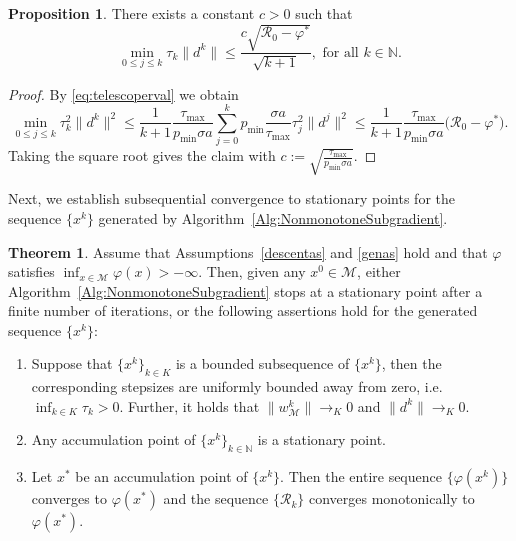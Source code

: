 \documentclass[a4paper, 12pt]{article}
\numberwithin{equation}{section}
\theoremstyle{bolddef}
\theoremstyle{definition}
\theoremstyle{boldplain}
\newtheorem{theorem}[definition]{Theorem}
\newtheorem{proposition}[definition]{Proposition}
\newcommand{\xk}{x^k}
\newcommand{\wk}{w^k}
\newcommand{\dk}{d^k}
\newcommand{\tauk}{\tau_k}
\newcommand{\pmin}{p_{\min}}
\newcommand{\taumax}{\tau_\mathrm{max}}
\newcommand{\Rvalue}{\mathcal{R}}
\begin{document}
\begin{proposition}\label{prop:convest}
There exists a constant $c > 0$ such that
\begin{equation}
	\min_{0 \leq j \leq k} \tauk \|\dk\| \leq \frac{c\sqrt{\Rvalue_0 - \varphi^*}}{\sqrt{k+1}}, \text{ for all } k \in \mathbb{N}.
\end{equation}
\end{proposition}
\begin{proof}
By \eqref{eq:telescoperval} we obtain
\begin{equation*}
	\min_{0 \leq j \leq k} \tauk^2 \|\dk\|^2 \leq \frac{1}{k+1} \frac{\taumax}{\pmin \sigma a}\sum_{j=0}^{k} \pmin \frac{\sigma a}{\taumax} \tau_j^2 \|d^j\|^2
	\leq \frac{1}{k+1} \frac{\taumax}{\pmin \sigma a} \big(\Rvalue_0 - \varphi^* \big).
\end{equation*}
Taking the square root gives the claim with $c:= \sqrt{\frac{\taumax}{\pmin \sigma a}}$.
\end{proof}

Next, we establish subsequential convergence to stationary points for the sequence $\{\xk\}$ generated by Algorithm~\ref{Alg:NonmonotoneSubgradient}. 

\begin{theorem}\label{thm:subsequenceconvergence}
Assume that Assumptions~\ref{descentas} and \ref{genas} hold and that $\varphi$ satisfies $\inf_{x \in \mathcal{M}} \varphi(x) > - \infty$. Then, given any $x^0 \in \mathcal{M}$, either Algorithm~\ref{Alg:NonmonotoneSubgradient} stops at a stationary point after a finite number of iterations, or the following assertions hold for the generated sequence $\{\xk\}$:
\begin{enumerate}
	\item Suppose that $\{\xk\}_{k \in K}$ is a bounded subsequence of $\{\xk\}$, then the corresponding stepsizes are uniformly bounded away from zero, i.e.\ $\inf_{k \in K} \tau_k > 0$. Further, it holds that $\| \wk_\mathcal{M} \| \to_K 0$ and $\| \dk \| \to_K 0$. 
	\item Any accumulation point of $\{\xk\}_{k \in \mathbb{N}}$ is a stationary point.
	\item Let $x^*$ be an accumulation point of $\{\xk\}$. Then the entire sequence $ \{ \varphi (\xk) \} $ converges to $\varphi (x^*) $ and the sequence $ \{ \Rvalue_k \} $ converges monotonically to $ \varphi (x^*) $.
\end{enumerate}
\end{theorem}
\end{document}
